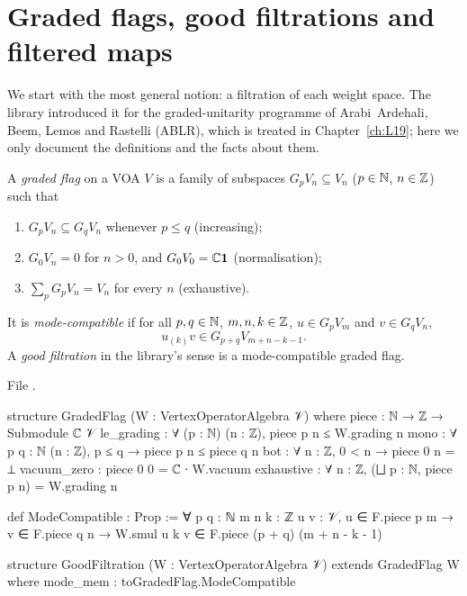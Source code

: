 \section{Graded flags, good filtrations and filtered maps}\label{l11:sec:flags}

We start with the most general notion: a filtration of each weight space. The library introduced it
for the graded-unitarity programme of Arabi~Ardehali, Beem, Lemos and Rastelli (ABLR), which is
treated in Chapter~\ref{ch:L19}; here we only document the definitions and the facts about them.

\begin{definition}\label{l11:def:flag}
A \emph{graded flag} on a VOA $V$ is a family of subspaces $G_pV_n\subseteq V_n$ ($p\in{\mathbb{N}}$,
$n\in{\mathbb{Z}}$) such that
\begin{enumerate}
\item $G_pV_n\subseteq G_qV_n$ whenever $p\le q$ (increasing);
\item $G_0V_n = 0$ for $n>0$, and $G_0V_0 = {\mathbb{C}}\mathbf{1}$ (normalisation);
\item $\sum_pG_pV_n = V_n$ for every $n$ (exhaustive).
\end{enumerate}
It is \emph{mode-compatible} if for all $p,q\in{\mathbb{N}}$, $m,n,k\in{\mathbb{Z}}$, $u\in G_pV_m$ and $v\in G_qV_n$,
\begin{equation}\label{l11:eq:modecompat}
u_{(k)}v\in G_{p+q}V_{m+n-k-1}.
\end{equation}
A \emph{good filtration} in the library's sense is a mode-compatible graded flag.
\end{definition}
\noindent File .
\begin{leancode}
structure GradedFlag (W : VertexOperatorAlgebra 𝒱) where
  piece : ℕ → ℤ → Submodule ℂ 𝒱
  le_grading : ∀ (p : ℕ) (n : ℤ), piece p n ≤ W.grading n
  mono : ∀ {p q : ℕ} (n : ℤ), p ≤ q → piece p n ≤ piece q n
  bot : ∀ n : ℤ, 0 < n → piece 0 n = ⊥
  vacuum_zero : piece 0 0 = ℂ ∙ W.vacuum
  exhaustive : ∀ n : ℤ, (⨆ p : ℕ, piece p n) = W.grading n

def ModeCompatible : Prop :=
  ∀ {p q : ℕ} {m n k : ℤ} {u v : 𝒱}, u ∈ F.piece p m → v ∈ F.piece q n →
    W.smul u k v ∈ F.piece (p + q) (m + n - k - 1)

structure GoodFiltration (W : VertexOperatorAlgebra 𝒱) extends GradedFlag W where
  mode_mem : toGradedFlag.ModeCompatible
\end{leancode}

